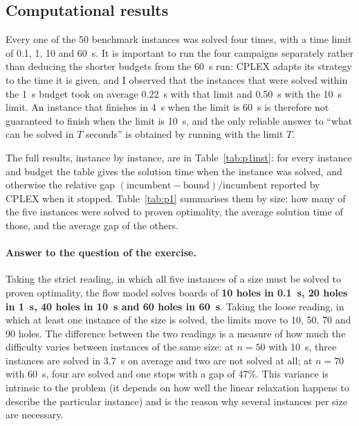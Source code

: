\documentclass[11pt,a4paper]{article}
\begin{document}
\subsection{Computational results}\label{sec:p1results}
Every one of the 50 benchmark instances was solved four times, with a time limit of 0.1, 1,
10 and 60~s. It is important to run the four campaigns separately rather than deducing the
shorter budgets from the 60~s run: CPLEX adapts its strategy to the time it is given, and I
observed that the instances that were solved within the 1~s budget took on average 0.22~s
with that limit and 0.50~s with the 10~s limit. An instance that finishes in 4~s when
the limit is 60~s is therefore not guaranteed to finish when the limit is 10~s, and the only
reliable answer to ``what can be solved in $T$ seconds'' is obtained by running with the limit
$T$.

The full results, instance by instance, are in Table~\ref{tab:p1inst}: for every instance
and budget the table gives the solution time when the instance was solved, and otherwise
the relative gap $(\text{incumbent}-\text{bound})/\text{incumbent}$ reported by CPLEX when it
stopped. Table~\ref{tab:p1} summarises them by size: how many of the five instances were
solved to proven optimality, the average solution time of those, and the average gap of the
others.

\begin{table}[htbp]\centering\small
\caption{Part I, summary by size: instances solved to optimality (out of 5), average solution
time of the solved instances and average gap of the unsolved ones, for every time budget.}
\label{tab:p1}
\resizebox{\textwidth}{!}{}
\end{table}

\paragraph{Answer to the question of the exercise.}
Taking the strict reading, in which all five instances of a size must be solved to proven
optimality, the flow model solves boards of \textbf{10 holes in 0.1~s, 20 holes in 1~s, 40
holes in 10~s and 60 holes in 60~s}. Taking the loose reading, in which at least one instance
of the size is solved, the limits move to 10, 50, 70 and 90 holes. The difference between the
two readings is a measure of how much the difficulty varies between instances of the same
size: at $n=50$ with 10~s, three instances are solved in 3.7~s on average and two are not
solved at all; at $n=70$ with 60~s, four are solved and one stops with a gap of 47\%. This
variance is intrinsic to the problem (it depends on how well the linear relaxation happens
to describe the particular instance) and is the reason why several instances per size are
necessary.
\end{document}
